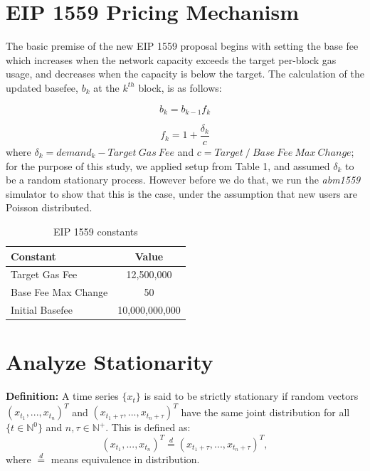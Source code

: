 \documentclass{article}
\begin{document}
\section{EIP 1559 Pricing Mechanism}
\label{section:eip_1559}

The basic premise of the new EIP 1559 proposal begins with setting the base fee which increases when the network capacity exceeds the target per-block gas usage, and decreases when the capacity is below the target. The calculation of the updated basefee, $b_{k}$ at the $k^{th}$ block, is as follows:

\begin{equation}
b_{k} = b_{k-1}f_{k}
\label{eq:eip1559} 
\end{equation}

\begin{equation}
f_{k} = 1 + \frac{\delta_{k}}{c}
\label{eq:fk} 
\end{equation}
where $\delta_{k} = demand_{k} - Target~Gas~Fee$ and $c = Target ~/~ Base~Fee~Max~Change$; for the purpose of this study, we applied setup from Table 1, and assumed $\delta_{k}$ to be a random stationary process. However before we do that, we run the \textit{abm1559} simulator \cite{Mon21} to show that this is the case, under the assumption that new users are Poisson distributed.

\begin{table}[h!]
\centering
\begin{tabular}{ |l|c| } 
\hline
 Constant & Value \\
\hline
Target Gas Fee & 12,500,000 \\
Base Fee Max Change & 50 \\
Initial Basefee & 10,000,000,000\\

\hline
\end{tabular}
\caption{EIP 1559 constants}
\label{table:pow_vs_pos}
\end{table}


\section{Analyze Stationarity}
\label{section:analyze_stationarity}

\textbf{Definition:} A time series $\{x_{t}\}$ is said to be strictly stationary if random vectors $(x_{t_{1}} , ... , x_{t_{n}} )^T $ and $(x_{t_{1}+\tau} , ... , x_{t_{n}+\tau} )^T$ have the same joint distribution for all $\{t \in \mathbb{N}^{0}\}$ and $n,\tau \in \mathbb{N}^{+}$. This is defined as:
\begin{equation}
(x_{t_{1}} , ... , x_{t_{n}})^T \stackrel{d}{=} (x_{t_{1}+\tau} , ... , x_{t_{n}+\tau} )^T,
\label{eq:ar1} 
\end{equation}
where $\stackrel{d}{=}$ means equivalence in distribution.
\end{document}
